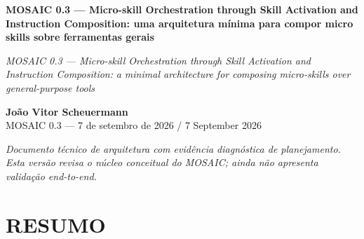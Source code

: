 \documentclass[12pt,a4paper]{article}
\begin{document}
\begin{center}\textbf{MOSAIC 0.3 — Micro-skill Orchestration through Skill Activation and Instruction Composition: uma arquitetura mínima para compor micro skills sobre ferramentas gerais}\par\end{center}

\textit{MOSAIC 0.3 — Micro-skill Orchestration through Skill Activation and Instruction Composition:} \textit{a minimal architecture for composing micro-skills over general-purpose tools}


\begin{center}\textbf{João Vitor Scheuermann}\\MOSAIC 0.3 — 7 de setembro de 2026 / 7 September 2026\end{center}

\textit{Documento técnico de arquitetura com evidência diagnóstica de planejamento. Esta versão} \textit{revisa o núcleo conceitual do MOSAIC; ainda não apresenta validação end-to-end.}


\section*{RESUMO}
\end{document}
